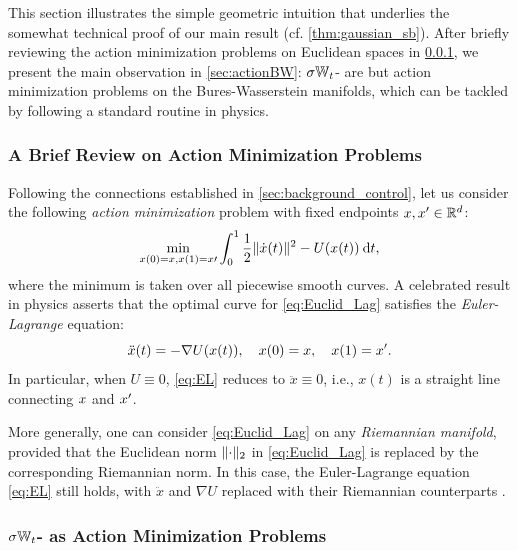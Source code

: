 This section illustrates the simple geometric intuition that underlies the somewhat technical proof of our main result (cf. \cref{thm:gaussian_sb}). After briefly reviewing the action minimization problems on Euclidean spaces in \cref{sec:actionRd}, we present the main observation in \cref{sec:actionBW}: $\sigma\mathbb{W}_{t}$- are but action minimization problems on the Bures-Wasserstein manifolds, which can be tackled by following a standard routine in physics. 

\subsubsection{A Brief Review on Action Minimization Problems} %
\label{sec:actionRd}

Following the connections established in \cref{sec:background_control}, let us consider the following \emph{action minimization} problem with fixed endpoints $x, x' \in \mathbb{R}^d$:
\begin{align}
\label{eq:Euclid_Lag}
\min_{x(0) = x, x(1) = x\prime} \int_0^1 {\frac{1}{2} \lVert\dot{x}(t)\rVert^2 - U(x(t)) } \:\mathrm{d} t,
\end{align}
where the minimum is taken over all piecewise smooth curves. 
A celebrated result in physics asserts that the optimal curve for \eqref{eq:Euclid_Lag} satisfies the \emph{Euler-Lagrange} equation:
\begin{equation}
\label{eq:EL}
\ddot{x}(t) = -\nabla U(x(t)), \quad x(0) = x,\quad x(1) = x'.
\end{equation}
In particular, when $U \equiv0$, \eqref{eq:EL} reduces to $\ddot{x} \equiv 0$, i.e., $x(t)$ is a straight line connecting $x$ and $x'$.

More generally, one can consider \eqref{eq:Euclid_Lag} on any \emph{Riemannian manifold}, provided that the Euclidean norm $\lVert\cdot\rVert_2$ in \eqref{eq:Euclid_Lag} is replaced by the corresponding Riemannian norm. In this case, the Euler-Lagrange equation \eqref{eq:EL} still holds, with $\ddot{x}$ and $\nabla U$ replaced with their Riemannian counterparts \citep{villani2009optimal}.

\subsubsection{$\sigma\mathbb{W}_{t}$- as Action Minimization Problems}


